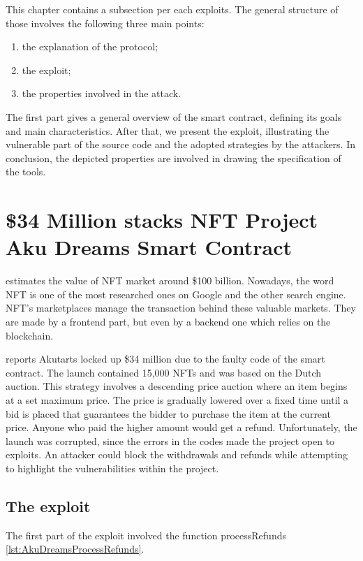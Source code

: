 This chapter contains a subsection per each exploits. The general structure of those involves the following three main points:
\begin{enumerate}
    \item the explanation of the protocol;
    \item the exploit;
    \item the properties involved in the attack.
\end{enumerate}
The first part gives a general overview of the smart contract, 
defining its goals and main characteristics. 
After that, we present the exploit, illustrating the vulnerable part of the source code and the adopted strategies 
by the attackers.
In conclusion, the depicted properties are involved in drawing the specification of the tools.



\section{\$34 Million stacks NFT Project Aku Dreams Smart Contract}
\label{sec:Exploits:AkuDreams}
\citet{NFTValue} estimates the value of NFT market around \$100 billion.
Nowadays, the word NFT is one of the most researched ones on Google and the other search engine.
NFT's marketplaces manage the transaction behind these valuable markets. 
They are made by a frontend part, but even by a backend one which relies on the blockchain. 

\citet{Aku} reports Akutarts locked up \$34 million due to the faulty code of the smart contract.
The launch contained 15,000  NFTs and was based on the Dutch auction. This strategy involves a descending price auction where an item begins at a set maximum price. 
The price is gradually lowered over a fixed time until a bid is placed that guarantees the bidder to purchase the item at the current price. 
Anyone who paid the higher amount would get a refund.
Unfortunately, the launch was corrupted, since the errors in the codes made the project open to exploits. 
An attacker could block the withdrawals and refunds while attempting to highlight the vulnerabilities within the project.

\subsection{The exploit}
\label{sec:AkuDreams:AkutarsExploit}

The first part of the exploit involved the function processRefunds \autoref{lst:AkuDreamsProcessRefunds}.

